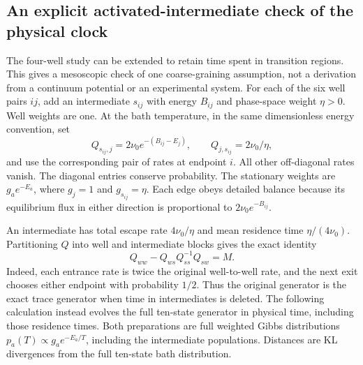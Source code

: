 \subsection{An explicit activated-intermediate check of the physical clock}
\label{sec:activatedintermediates}
The four-well study can be extended to retain time spent in transition
regions. This gives a mesoscopic check of one coarse-graining assumption,
not a derivation from a continuum potential or an experimental system.
For each of the six well pairs $ij$, add an intermediate $s_{ij}$ with
energy $B_{ij}$ and phase-space weight $\eta>0$. Well weights are one.
At the bath temperature, in the same dimensionless energy convention,
set
\[
 Q_{s_{ij},j}=2\nu_0 e^{-(B_{ij}-E_j)},\qquad
 Q_{j,s_{ij}}=2\nu_0/\eta,
\]
and use the corresponding pair of rates at endpoint $i$. All other
off-diagonal rates vanish. The diagonal entries conserve probability.
The stationary weights are $g_a e^{-E_a}$, where $g_j=1$ and
$g_{s_{ij}}=\eta$. Each edge obeys detailed balance because its equilibrium
flux in either direction is proportional to $2\nu_0 e^{-B_{ij}}$.

An intermediate has total escape rate $4\nu_0/\eta$ and mean residence
time $\eta/(4\nu_0)$. Partitioning $Q$ into well and intermediate blocks
gives the exact identity
\[
 Q_{ww}-Q_{ws}Q_{ss}^{-1}Q_{sw}=M.
\]
Indeed, each entrance rate is twice the original well-to-well rate,
and the next exit chooses either endpoint with probability $1/2$.
Thus the original generator is the exact trace generator when time in
intermediates is deleted. The following calculation instead evolves the
full ten-state generator in physical time, including those residence
times. Both preparations are full weighted Gibbs distributions
$p_a(T)\propto g_a e^{-E_a/T}$, including the intermediate populations.
Distances are KL divergences from the full ten-state bath distribution.

